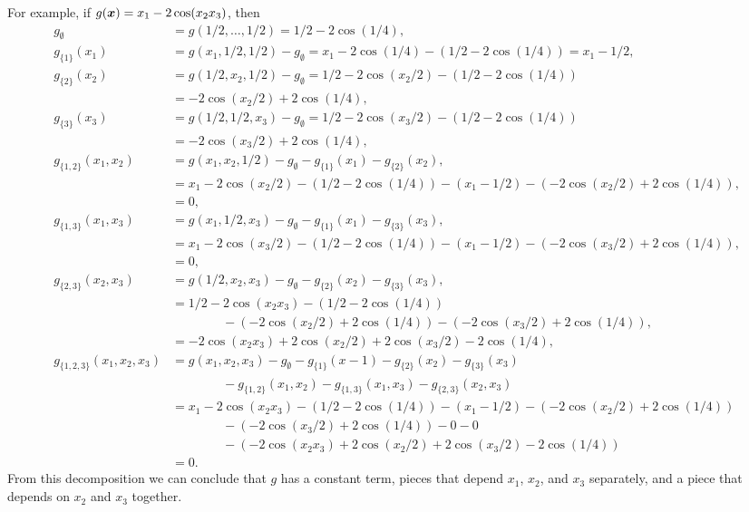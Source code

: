 \documentclass[letterpaper]{amsart}
\begin{document}
For example, if $g(\boldsymbol{x}) = x_1 -2 \cos(x_2 x_3)$, then
\begin{align*}
	g_\emptyset &= g(1/2, \ldots, 1/2) = 1/2 - 2 \cos(1/4), \\
	g_{\{1\}}(x_1) &= g(x_1,1/2,1/2) - g_{\emptyset} = x_1 - 2 \cos(1/4) - ( 1/2 - 2 \cos(1/4)) = x_1 - 1/2,\\
	g_{\{2\}}(x_2) &= g(1/2,x_2,1/2) - g_\emptyset = 1/2 - 2 \cos(x_2/2) - (1/2 - 2 \cos(1/4)) \\
	& = -2 \cos(x_2/2) + 2\cos(1/4),\\
	g_{\{3\}}(x_3) &= g(1/2,1/2, x_3) - g_\emptyset = 1/2 - 2 \cos(x_3/2) - (1/2 - 2 \cos(1/4)) \\
	&= -2  \cos(x_3/2) + 2\cos(1/4),\\
	g_{\{1,2\}}(x_1,x_2) &= g(x_1,x_2,1/2) - g_\emptyset -g_{\{1\}}(x_1) -g_{\{2\}}(x_2), \\
	& = x_1 - 2 \cos(x_2/2) - (1/2 - 2 \cos(1/4)) - (x_1 - 1/2) - (-2\cos(x_2/2) +2 \cos(1/4)),\\
	& = 0,\\
	g_{\{1,3\}}(x_1,x_3) &= g(x_1,1/2,x_3) - g_\emptyset -g_{\{1\}}(x_1) -g_{\{3\}}(x_3), \\
	& = x_1 - 2 \cos(x_3/2) - (1/2 - 2 \cos(1/4)) - (x_1 - 1/2) - (-2\cos(x_3/2) +2 \cos(1/4)),\\
	& = 0, \\
	g_{\{2,3\}}(x_2,x_3) &= g(1/2,x_2,x_3) - g_\emptyset -g_{\{2\}}(x_2) -g_{\{3\}}(x_3), \\
	& = 1/2- 2 \cos(x_2x_3) - (1/2 - 2 \cos(1/4)) \\
	& \qquad \qquad - (-2\cos(x_2/2) +2 \cos(1/4)) - (-2\cos(x_3/2) +2 \cos(1/4)),\\
	& = -2\cos(x_2x_3) + 2 \cos(x_2/2) + 2 \cos(x_3/2) -2\cos(1/4), \\
	g_{\{1,2,3\}}(x_1,x_2,x_3) &= g(x_1,x_2,x_3) -
	g_\emptyset - g_{\{1\}}(x-1) - g_{\{2\}}(x_2) -g_{\{3\}}(x_3) \\
	& \qquad \qquad - g_{\{1,2\}}(x_1,x_2) - g_{\{1,3\}}(x_1,x_3) - g_{\{2,3\}}(x_2,x_3) \\
	& = x_1 -2 \cos(x_2 x_3) - (1/2 - 2 \cos(1/4)) - (x_1 - 1/2) - (-2\cos(x_2/2) +2 \cos(1/4)) \\
	& \qquad \qquad - (-2\cos(x_3/2) +2 \cos(1/4)) - 0 - 0 \\
	& \qquad \qquad - ( -2\cos(x_2x_3) + 2 \cos(x_2/2) + 2 \cos(x_3/2) -2\cos(1/4)) \\
	& = 0.
\end{align*}
From this decomposition we can conclude that $g$ has a constant term, pieces that depend $x_1$, $x_2$, and $x_3$ separately, and a piece that depends on $x_2$ and $x_3$ together.
\end{document}
